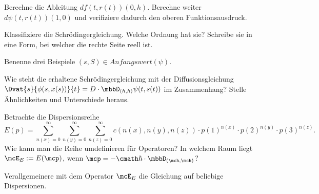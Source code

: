 \documentclass{subfiles}
\begin{document}
    \begin{Aufgabe}
        \nr{} Berechne die Ableitung $df(t,r(t))(0,h)$. Berechne weiter $d\psi(t,r(t))(1,0)$ und verifiziere dadurch den oberen Funktionsausdruck.

        \nr{} Klassifiziere die Schrödingergleichung. Welche Ordnung hat sie? Schreibe sie in eine Form, bei welcher die rechte Seite reell ist. 

        \nr{} Benenne drei Beispiele $(s,S)\in\textit{Anfangswert}(\psi)$. 

        \nr{} Wie steht die erhaltene Schrödingergleichung mit der Diffusionsgleichung $\Dvat{s}{\phi(s,x(s))}{t} = D\cdot \mbbD_{(h,h)}\psi(t,s(t))$ im Zusammenhang? Stelle Ähnlichkeiten und Unterschiede heraus. 

        \nr{} Betrachte die Dispersionsreihe 
        \[E(p) = \sum_{n(x) = 0}^\infty\sum_{n(y) = 0}^\infty\sum_{n(z) = 0}^\infty c(n(x),n(y),n(z))\cdot p(1)^{n(x)}\cdot p(2)^{n(y)}\cdot p(3)^{n(z)}.\]
        Wie kann man die Reihe umdefinieren für Operatoren? In welchem Raum liegt $\mcE_E:=E(\mcp)$, wenn $\mcp=-\cmath\hbar\cdot\mbbD_{(\mch,\mch)}$? 

        \nr{} Verallgemeinere mit dem Operator $\mcE_E$ die Gleichung auf beliebige Dispersionen. 
    \end{Aufgabe}
\end{document}

